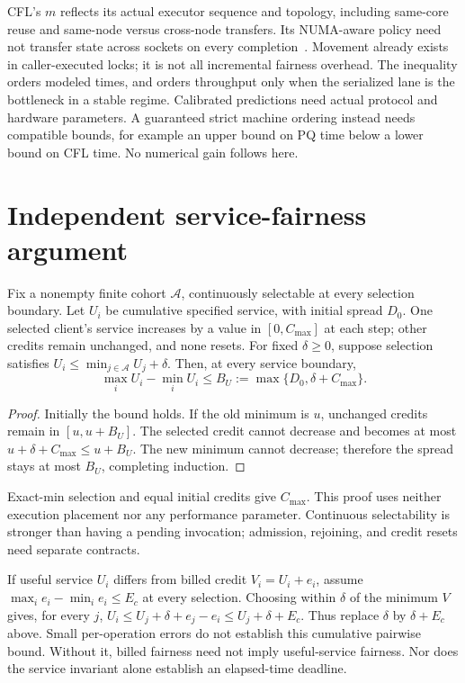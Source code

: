 CFL's $m$ reflects its actual executor sequence and topology, including
same-core reuse and same-node versus cross-node transfers. Its NUMA-aware
policy need not transfer state across sockets on every completion~\cite{cfl}.
Movement already exists in caller-executed locks; it is not all incremental
fairness overhead. The inequality orders modeled times, and orders throughput
only when the serialized lane is the bottleneck in a stable regime. Calibrated
predictions need actual protocol and hardware parameters. A guaranteed strict
machine ordering instead needs compatible bounds, for example an upper bound
on PQ time below a lower bound on CFL time. No numerical gain follows here.

\section{Independent service-fairness argument}
\label{app:fairness}
Fix a nonempty finite cohort $\mathcal A$, continuously selectable at every
selection boundary. Let $U_i$ be cumulative specified service, with initial
spread $D_0$. One selected client's service increases by a value in
$[0,C_{\max}]$ at each step; other credits remain unchanged, and none resets.
For fixed $\delta\ge0$, suppose selection satisfies
$U_i\le\min_{j\in\mathcal A}U_j+\delta$. Then, at every service boundary,
\begin{equation}
 \max_i U_i-\min_i U_i\le B_U:=\max\{D_0,\delta+C_{\max}\}.
 \label{eq:appendixspread}
\end{equation}
\begin{proof}
Initially the bound holds. If the old minimum is $u$, unchanged credits
remain in $[u,u+B_U]$. The selected credit cannot decrease and becomes at
most $u+\delta+C_{\max}\le u+B_U$. The new minimum cannot decrease;
therefore the spread stays at most $B_U$, completing induction.
\end{proof}
Exact-min selection and equal initial credits give $C_{\max}$. This proof
uses neither execution placement nor any performance parameter. Continuous
selectability is stronger than having a pending invocation; admission,
rejoining, and credit resets need separate contracts.

If useful service $U_i$ differs from billed credit $V_i=U_i+e_i$, assume
$\max_i e_i-\min_i e_i\le E_c$ at every selection. Choosing within $\delta$
of the minimum $V$ gives, for every $j$,
$U_i\le U_j+\delta+e_j-e_i\le U_j+\delta+E_c$.
Thus replace $\delta$ by $\delta+E_c$ above. Small per-operation errors do
not establish this cumulative pairwise bound. Without it, billed fairness
need not imply useful-service fairness. Nor does the service invariant
alone establish an elapsed-time deadline.


